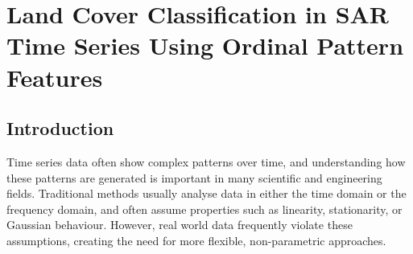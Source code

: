 \documentclass[
  conference]{IEEEtran}
\newcommand*\listoflistings{\listof{codelisting}{List of Listings}}
\begin{document}
	
	\tableofcontents
	\listoffigures
	\listoftables
	\listoflistings
	
\chapter{Land Cover Classification in SAR Time Series Using Ordinal Pattern Features}
	
\begin{abstract}
This study investigates ordinal-pattern-based features for Land Use/Land Cover (LULC) classification using Synthetic Aperture Radar (SAR) time series data. Temporal dynamics are characterized through normalized Shannon entropy, Shannon statistical complexity, Fisher Information Measure (FIM), and Fisher-based complexity derived from ordinal pattern distribution. The methodology is applied to SAR time series from five LULC classes: Agriculture, Deforested, Forest, Urban, and Water. The resulting features are analysed using Shannon and Fisher information-complexity planes and a Support Vector Machine (SVM) classifier. The information-complexity representations reveal partial class separation, with Agriculture exhibiting the clearest distinction from the remaining classes, while substantial overlap persists among Forest, Deforested, Urban, and Water samples. Classification results show that Agriculture and Forest achieved the highest sensitivities (\SI{83.3}{\percent} and \SI{91.7}{\percent}, respectively), whereas Urban and Water remain the most challenging LULC classes to distinguish. These findings indicate that ordinal-pattern-based features capture meaningful temporal characteristics of SAR time series and provide useful information for LULC classification, although discrimination among classes with similar temporal dynamics remains challenging.

\end{abstract}

\section{Introduction}\label{introduction}

Time series data often show complex patterns over time, and
understanding how these patterns are generated is important in many
scientific and engineering fields. Traditional methods usually analyse
data in either the time domain or the frequency domain, and often assume
properties such as linearity, stationarity, or Gaussian behaviour.
However, real world data frequently violate these assumptions, creating
the need for more flexible, non-parametric approaches.
\end{document}
